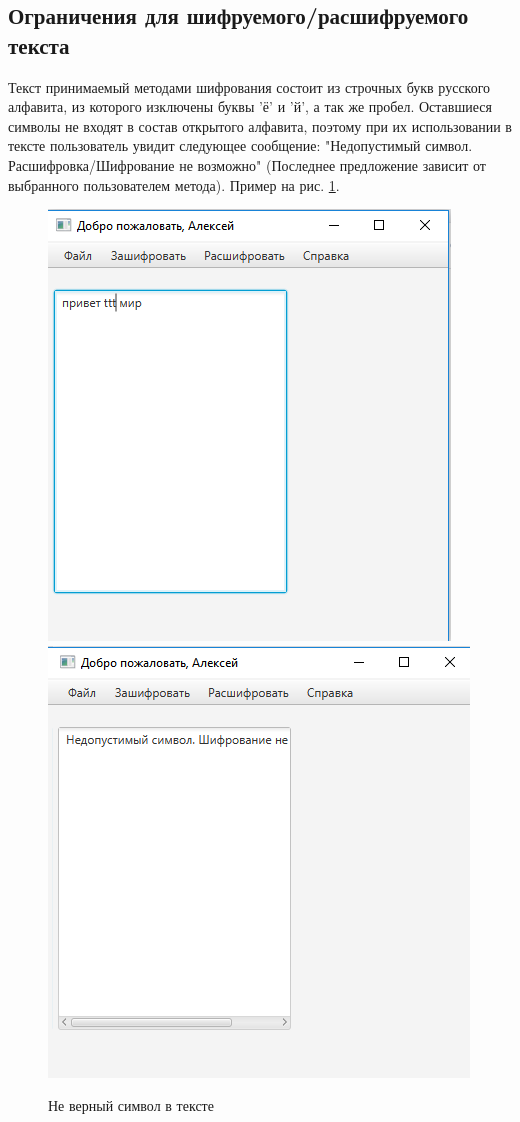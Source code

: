 \documentclass[a4paper,12pt]{article}
\begin{document}
\subsection{Ограничения для шифруемого/расшифруемого текста}
Текст принимаемый методами шифрования состоит из строчных букв русского алфавита, из которого изключены буквы 'ё' и 'й', а так же пробел. Оставшиеся символы не входят в состав открытого алфавита, поэтому при их использовании в тексте пользователь увидит следующее сообщение: "Недопустимый символ. Расшифровка/Шифрование не возможно" (Последнее предложение зависит от выбранного пользователем метода). Пример на рис. \ref{fig:wrong_char_and_response}.
\begin{center}
	\begin{figure}[h!]
		\centering
		\includegraphics[scale=0.7]{img/wrong_char.png}
		\includegraphics[scale=0.7]{img/wrong_char_response.png}
		\caption{Не верный символ в тексте}
		\label{fig:wrong_char_and_response}
	\end{figure}
\end{center}
\end{document}
